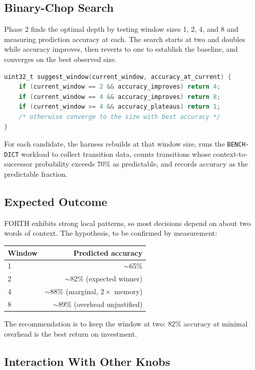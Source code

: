\subsection{Binary-Chop Search}

Phase 2 finds the optimal depth by testing window sizes 1, 2, 4, and 8 and
measuring prediction accuracy at each. The search starts at two and doubles
while accuracy improves, then reverts to one to establish the baseline, and
converges on the best observed size.

\begin{lstlisting}[language=C]
uint32_t suggest_window(current_window, accuracy_at_current) {
    if (current_window == 2 && accuracy_improves) return 4;
    if (current_window == 4 && accuracy_improves) return 8;
    if (current_window >= 4 && accuracy_plateaus) return 1;
    /* otherwise converge to the size with best accuracy */
}
\end{lstlisting}

For each candidate, the harness rebuilds at that window size, runs the
\lstinline{BENCH-DICT} workload to collect transition data, counts transitions
whose context-to-successor probability exceeds $70\%$ as predictable, and
records accuracy as the predictable fraction.

\subsection{Expected Outcome}

FORTH exhibits strong local patterns, so most decisions depend on about two
words of context. The hypothesis, to be confirmed by measurement:

\begin{tabular}{lr}
\toprule
Window & Predicted accuracy \\
\midrule
1 & $\sim$65\% \\
2 & $\sim$82\% (expected winner) \\
4 & $\sim$88\% (marginal, $2\times$ memory) \\
8 & $\sim$89\% (overhead unjustified) \\
\bottomrule
\end{tabular}

\medskip
\noindent The recommendation is to keep the window at two: $82\%$ accuracy at
minimal overhead is the best return on investment.

\subsection{Interaction With Other Knobs}

